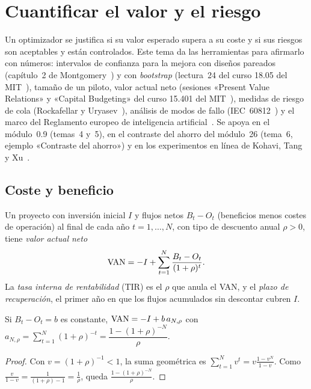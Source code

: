 \chapter{Cuantificar el valor y el riesgo}
\label{tema:5}

Un optimizador se justifica si su valor esperado supera a su coste y si sus riesgos son aceptables y están controlados. Este tema da las herramientas para afirmarlo con números: intervalos de confianza para la mejora con diseños pareados (capítulo~2 de Montgomery~\cite{montgomery}) y con \emph{bootstrap} (lectura~24 del curso 18.05 del MIT~\cite{mit1805}), tamaño de un piloto, valor actual neto (sesiones «Present Value Relations» y «Capital Budgeting» del curso 15.401 del MIT~\cite{mit15401}), medidas de riesgo de cola (Rockafellar y Uryasev~\cite{ru}), análisis de modos de fallo (IEC~60812~\cite{iec60812}) y el marco del Reglamento europeo de inteligencia artificial~\cite{aiact,omnibus}. Se apoya en el módulo~0.9 (temas~4 y~5), en el contraste del ahorro del módulo~26 (tema~6, ejemplo «Contraste del ahorro») y en los experimentos en línea de Kohavi, Tang y Xu~\cite{kohavi}.

\section{Coste y beneficio}

\begin{definicion}\label{def:van}
Un proyecto con inversión inicial $I$ y flujos netos $B_t-O_t$ (beneficios menos costes de operación) al final de cada año $t=1,\dots,N$, con tipo de descuento anual $\rho>0$, tiene \emph{valor actual neto}
\[
\operatorname{VAN}=-I+\sum_{t=1}^{N}\frac{B_t-O_t}{(1+\rho)^{t}}.
\]
La \emph{tasa interna de rentabilidad} (TIR) es el $\rho$ que anula el VAN, y el \emph{plazo de recuperación}, el primer año en que los flujos acumulados sin descontar cubren $I$.
\end{definicion}

\begin{proposicion}[Anualidad]\label{prop:anualidad}
Si $B_t-O_t=b$ es constante, $\operatorname{VAN}=-I+b\,a_{N,\rho}$ con $a_{N,\rho}=\sum_{t=1}^{N}(1+\rho)^{-t}=\dfrac{1-(1+\rho)^{-N}}{\rho}$.
\end{proposicion}

\begin{proof}
Con $v=(1+\rho)^{-1}<1$, la suma geométrica es $\sum_{t=1}^{N}v^{t}=v\frac{1-v^{N}}{1-v}$. Como $\frac{v}{1-v}=\frac{1}{(1+\rho)-1}=\frac1\rho$, queda $\frac{1-(1+\rho)^{-N}}{\rho}$.
\end{proof}

